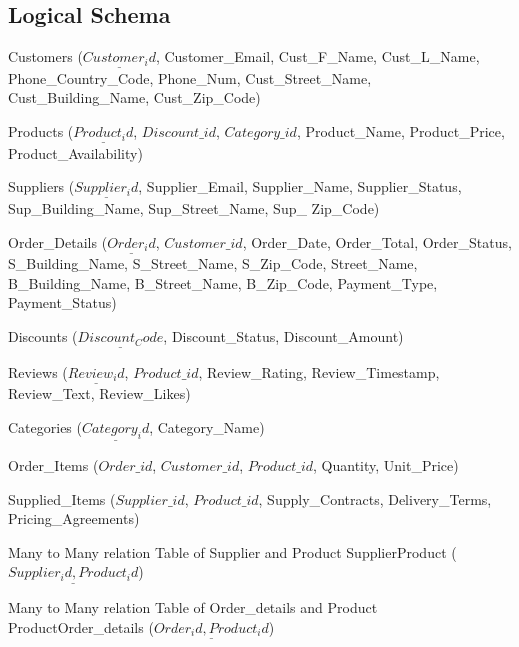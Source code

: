 \documentclass[
]{article}
\begin{document}
\hypertarget{logical-schema}{%
\subsection{Logical Schema}\label{logical-schema}}

Customers (\(\underline{Customer_id}\), Customer\_Email, Cust\_F\_Name,
Cust\_L\_Name, Phone\_Country\_Code, Phone\_Num, Cust\_Street\_Name,
Cust\_Building\_Name, Cust\_Zip\_Code)

Products (\(\underline{Product_id}\), \({\textit{Discount_id}}\),
\({\textit{Category_id}}\), Product\_Name, Product\_Price,
Product\_Availability)

Suppliers (\(\underline{Supplier_id}\), Supplier\_Email, Supplier\_Name,
Supplier\_Status, Sup\_Building\_Name, Sup\_Street\_Name, Sup\_
Zip\_Code)

Order\_Details (\(\underline{Order_id}\), \({\textit{Customer_id}}\),
Order\_Date, Order\_Total, Order\_Status, S\_Building\_Name,
S\_Street\_Name, S\_Zip\_Code, Street\_Name, B\_Building\_Name,
B\_Street\_Name, B\_Zip\_Code, Payment\_Type, Payment\_Status)

Discounts (\(\underline{Discount_Code}\), Discount\_Status,
Discount\_Amount)

Reviews (\(\underline{Review_id}\), \({\textit{Product_id}}\),
Review\_Rating, Review\_Timestamp, Review\_Text, Review\_Likes)

Categories (\(\underline{Category_id}\), Category\_Name)

Order\_Items (\({\textit{Order_id}}\), \({\textit{Customer_id}}\),
\({\textit{Product_id}}\), Quantity, Unit\_Price)

Supplied\_Items (\(\textit{Supplier_id}\), \({\textit{Product_id}}\),
Supply\_Contracts, Delivery\_Terms, Pricing\_Agreements)

Many to Many relation Table of Supplier and Product SupplierProduct
(\(\underline{Supplier_id,Product_id}\))

Many to Many relation Table of Order\_details and Product
ProductOrder\_details (\(\underline{Order_id, Product_id}\))
\end{document}
